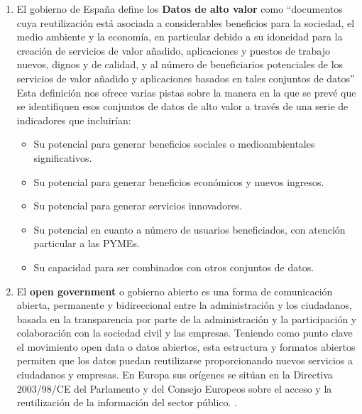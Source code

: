 \begin{enumerate}
	\item El gobierno de España define los \textbf{Datos de alto valor} \label{def1}  como “documentos cuya reutilización está asociada a considerables beneficios para la sociedad, el medio ambiente y la economía, en particular debido a su idoneidad para la creación de servicios de valor añadido, aplicaciones y puestos de trabajo nuevos, dignos y de calidad, y al número de beneficiarios potenciales de los servicios de valor añadido y aplicaciones basados en tales conjuntos de datos” Esta definición nos ofrece varias pistas sobre la manera en la que se prevé que se identifiquen esos conjuntos de datos de alto valor a través de una serie de indicadores que incluirían:
		\begin{itemize}
			\item Su potencial para generar beneficios sociales o medioambientales significativos.
			
			\item Su potencial para generar beneficios económicos y nuevos ingresos.
			
			\item Su potencial para generar servicios innovadores.
			
			\item Su potencial en cuanto a número de usuarios beneficiados, con atención particular a las PYMEs.
			
			\item Su capacidad para ser combinados con otros conjuntos de datos. \\
		\end{itemize}
		
	\item El \textbf{open government} \label{def2} o gobierno abierto es una forma de comunicación abierta, permanente y bidireccional entre la administración y los ciudadanos, basada en la transparencia por parte de la administración y la participación y colaboración con la sociedad civil y las empresas. Teniendo como punto clave el movimiento open data o datos abiertos, esta estructura y formatos abiertos permiten que los datos puedan reutilizarse proporcionando nuevos servicios a ciudadanos y empresas. En Europa sus orígenes se sitúan en la Directiva 2003/98/CE del Parlamento y del Consejo Europeos sobre el acceso y la reutilización de la información del sector público. \citep{OperGovernment2011}. \\
	

\end{enumerate}
